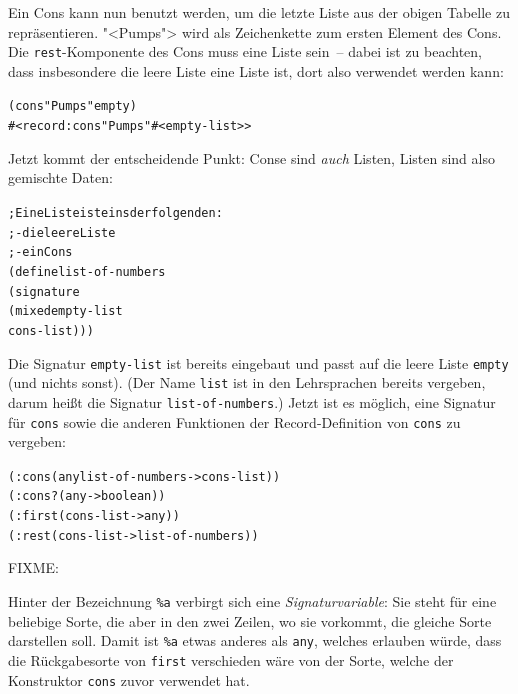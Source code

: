 Ein Cons kann nun benutzt werden, um die letzte Liste aus der obigen
Tabelle zu repräsentieren.  "<Pumps"> wird als Zeichenkette zum ersten
Element des Cons.  Die \texttt{rest}-Komponente des Cons muss eine
Liste sein~-- dabei ist zu beachten, dass insbesondere die leere Liste
eine Liste ist, dort also verwendet werden kann:
%
\begin{alltt}
(cons "Pumps" empty)
\evalsto{} #<record:cons "Pumps" #<empty-list>>
\end{alltt}
%
Jetzt kommt der entscheidende Punkt: Conse sind \emph{auch} Listen,
Listen sind also gemischte Daten:\label{def:list-of-numbers}
%
\begin{alltt}
; Eine Liste ist eins der folgenden:
; - die leere Liste
; - ein Cons
(define list-of-numbers
  (signature
   (mixed empty-list
          cons-list)))
\end{alltt}
%
Die Signatur \texttt{empty-list} ist bereits eingebaut und passt auf
die leere Liste \texttt{empty} (und nichts sonst).  (Der Name
\texttt{list} ist in den Lehrsprachen bereits vergeben, darum
heißt die Signatur \texttt{list-of-numbers}.)  Jetzt ist es möglich, eine
Signatur für \texttt{cons} sowie die anderen Funktionen der
Record-Definition von \texttt{cons} zu vergeben:
%
\begin{alltt}
(: cons (any list-of-numbers -> cons-list))
(: cons? (any -> boolean))
(: first (cons-list -> any))
(: rest (cons-list -> list-of-numbers))
\end{alltt}
%
FIXME:

Hinter der Bezeichnung \verb$%a$ verbirgt sich eine 
\emph{Signaturvariable}: Sie
steht für eine beliebige Sorte, die aber in den zwei Zeilen, wo sie vorkommt,
die gleiche Sorte darstellen soll.  Damit ist \verb$%a$ etwas anderes als
\texttt{any}, welches erlauben würde, dass die Rückgabesorte von \texttt{first}
verschieden wäre von der Sorte, welche der Konstruktor \texttt{cons} zuvor
verwendet hat.

